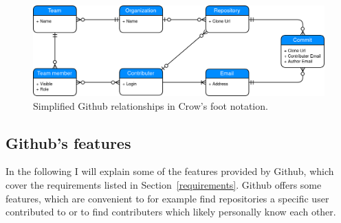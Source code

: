 \begin{figure}[H]
\includegraphics[scale=0.27]{./graphs/github-data-structure}
\centering
\caption{Simplified Github relationships in Crow's foot notation.}\label{fig:github-relationship}
\end{figure}

\subsection{Github's features}\label{github-features}
In the following I will explain some of the features provided by Github, which cover the requirements listed in Section~\ref{requirements}.
Github offers some features, which are convenient to for example find repositories a specific user contributed to or to find contributers which likely personally know each other.

